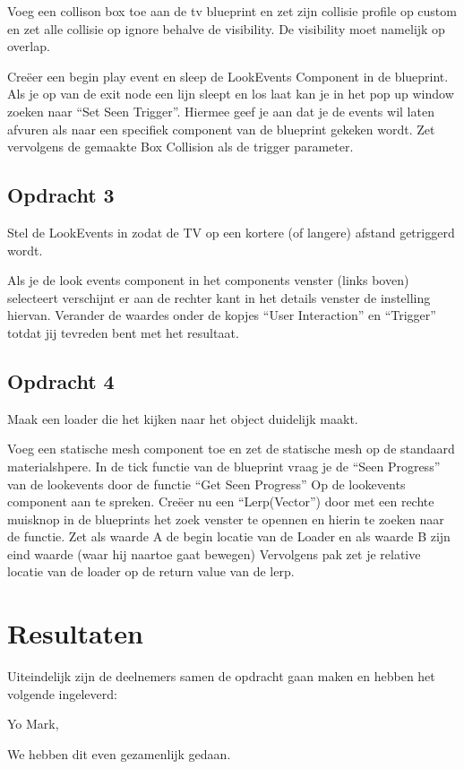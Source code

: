 Voeg een collison box toe aan de tv blueprint en zet zijn collisie profile op custom en zet alle collisie op ignore behalve de visibility. De visibility moet namelijk op overlap.

Creëer een begin play event en sleep de LookEvents Component in de blueprint. Als je op van de exit node een lijn sleept en los laat kan je in het pop up window zoeken naar “Set Seen Trigger”. Hiermee geef je aan dat je de events wil laten afvuren als naar een specifiek component van de blueprint gekeken wordt. Zet vervolgens de gemaakte Box Collision als de trigger parameter.

\subsection{Opdracht 3}
Stel de LookEvents in zodat de TV op een kortere (of langere) afstand getriggerd wordt.

Als je de look events component in het components venster (links boven) selecteert verschijnt er aan de rechter kant in het details venster de instelling hiervan. 
Verander de waardes onder de kopjes “User Interaction” en “Trigger” totdat jij tevreden bent met het resultaat.

\subsection{Opdracht 4}
Maak een loader die het kijken naar het object duidelijk maakt.

Voeg een statische mesh component toe en zet de statische mesh op de standaard materialshpere.
In de tick functie van de blueprint vraag je de “Seen Progress” van de lookevents door de functie “Get Seen Progress” Op de lookevents component aan te spreken.
Creëer nu een “Lerp(Vector”) door met een rechte muisknop in de blueprints het zoek venster te opennen en hierin te zoeken naar de functie.
Zet als waarde A de begin locatie van de Loader en als waarde B zijn eind waarde (waar hij naartoe gaat bewegen)
Vervolgens pak zet je relative locatie  van de loader op de return value van de lerp.

\section{Resultaten}
Uiteindelijk zijn de deelnemers samen de opdracht gaan maken en hebben het volgende ingeleverd:

Yo Mark,

We hebben dit even gezamenlijk gedaan. 

